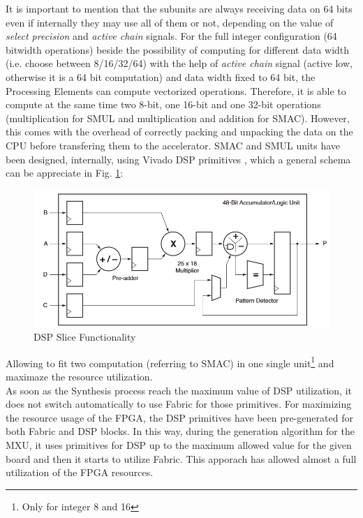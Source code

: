 It is important to mention that the subunits are always receiving data on 64 bits even if internally they may use all of them or not, depending on the value of \textit{select precision}  and \textit{active chain} signals. For the full integer configuration (64 bitwidth operations) beside the possibility of computing for different data width (i.e. choose between 8/16/32/64) with the help of \textit{active chain} signal (active low, otherwise it is a 64 bit computation) and data width fixed to 64 bit, the Processing Elements can compute vectorized operations. Therefore, it is able to compute at the same time two 8-bit, one 16-bit and one 32-bit operations (multiplication for SMUL and multiplication and addition for SMAC).
However, this comes with the overhead of correctly packing and unpacking the data on the CPU before transfering them to the accelerator.
\newpage
SMAC and SMUL units have been designed, internally, using Vivado DSP primitives \cite{paper:48}, which a general schema can be appreciate in Fig. \ref{fig:dsp}:
\begin{figure}[H]
\centering
\captionsetup{justification=centering}
\includegraphics[scale=0.5,angle=0]{./figure/vivado_dsp.png}
\caption{ DSP Slice Functionality\cite{paper:48} }
\label{fig:dsp}
\end{figure} 
Allowing to fit two computation (referring to SMAC) in one single unit\footnote{Only for integer 8 and 16} and maximaze the resource utilization.\\

As soon as the Synthesis process reach the maximum value of DSP utilization, it does not switch automatically to use Fabric for those primitives. For maximizing the resource usage of the FPGA, the DSP primitives have been pre-generated for both Fabric and DSP blocks. In this way, during the generation algorithm for the MXU, it uses primitives for DSP up to the maximum allowed value for the given board and then it starts to utilize Fabric.
This apporach has allowed almost a full utilization of the FPGA resources.
